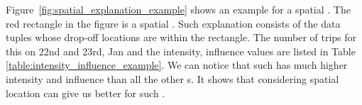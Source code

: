 Figure~\ref{fig:spatial_explanation_example} shows an example for a spatial {\explanation}. The red rectangle in the figure is a spatial {\explanation}. Such explanation consists of the data tuples whose drop-off locations are within the rectangle. The number of trips for this {\explanation} on 22nd and 23rd, Jan and the intensity, influence values are listed in Table \ref{table:intensity_influence_example}. We can notice that such {\explanation} has much higher intensity and influence than all the other {\explanation}s. It shows that considering spatial location can give us better {\explanation} for such {\fact}. 








